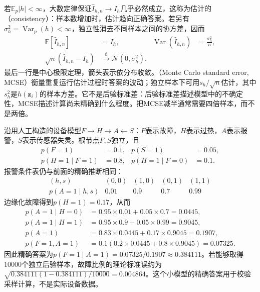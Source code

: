 若$\mathbb{E}_p|h|<\infty$，大数定律保证$\widehat I_{h,n}\to I_h$几乎必然成立，这称为估计的（consistency）：样本数增加时，估计趋向正确答案。若另有$\sigma_h^2=\operatorname{Var}_p(h)<\infty$，独立性消去不同样本之间的协方差，因而
\begin{equation}
  \begin{aligned}
    \mathbb{E}[\widehat I_{h,n}]&=I_h,&
    \operatorname{Var}(\widehat I_{h,n})&=\frac{\sigma_h^2}{n},\\
    \sqrt n(\widehat I_{h,n}-I_h)&\xrightarrow{\mathrm{d}}
      \mathcal{N}(0,\sigma_h^2).
  \end{aligned}
  \label{eq:pgm-sampling-iid-clt}
\end{equation}
最后一行是中心极限定理，箭头表示依分布收敛。（Monte Carlo standard error, MCSE）衡量重复运行估计过程时答案的波动；独立样本下可用$s_h/\sqrt n$估计，其中$s_h^2$是$h(\bm{z}_i)$的样本方差。它不是后验标准差：后验标准差描述模型中的不确定性，MCSE描述计算尚未精确到什么程度。把MCSE减半通常需要四倍样本，而不是两倍。

\begin{example}[报警后的故障概率]
  \label{ex:pgm-sampling-device}
  沿用人工构造的设备模型$F\to H\to A\leftarrow S$：$F$表示故障，$H$表示过热，$A$表示报警，$S$表示传感器失灵。根节点$F,S$独立，且
  \[
    \begin{aligned}
      p(F=1)&=0.1,&p(S=1)&=0.05,\\
      p(H=1\mid F=1)&=0.8,&
      p(H=1\mid F=0)&=0.1.
    \end{aligned}
  \]
  报警条件表仍与前面的精确推断相同：
  \[
    \begin{array}{ccccc}
      (h,s)&(0,0)&(1,0)&(0,1)&(1,1)\\
      p(A=1\mid h,s)&0.01&0.9&0.7&0.99
    \end{array}
  \]
  边缘化故障得到$p(H=1)=0.17$，从而
  \[
    \begin{aligned}
      p(A=1\mid H=0)&=0.95\times0.01+0.05\times0.7=0.0445,\\
      p(A=1\mid H=1)&=0.95\times0.9+0.05\times0.99=0.9045,\\
      p(A=1)&=0.83\times0.0445+0.17\times0.9045=0.1907,\\
      p(F=1,A=1)&=0.1(0.2\times0.0445+0.8\times0.9045)=0.07325.
    \end{aligned}
  \]
  因此精确答案为$p(F=1\mid A=1)=0.07325/0.1907\approx0.384111$。若能够取得$10000$个独立后验样本，故障比例的理论标准误约为$\sqrt{0.384111(1-0.384111)/10000}=0.004864$。这个小模型的精确答案用于校验采样计算，不是实际设备数据。
\end{example}

